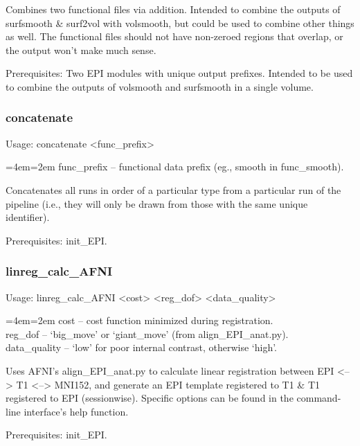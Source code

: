 \documentclass[final,titlepage,letterpaper,oneside,12pt]{article}
\renewcommand{\texttt}[2][BrickRed]{\textcolor{#1}{\ttfamily #2}}%
\newenvironment{blockquote}{%
  \par%
  \medskip
  \leftskip=4em\rightskip=2em%
  \noindent\ignorespaces}{%
  \par\medskip}
\begin{document}
\noindent Combines two functional files via addition. Intended to combine the outputs of \texttt{surfsmooth} \& \texttt{surf2vol} with \texttt{volsmooth}, but could be used to combine other things as well. The functional files should not have non-zeroed regions that overlap, or the output won't make much sense.

Prerequisites: Two EPI modules with unique output prefixes. Intended to be used to combine the outputs of \texttt{volsmooth} and \texttt{surfsmooth} in a single volume. 

\subsubsection{concatenate}
Usage: \texttt{concatenate <func\_prefix>}

\begin{blockquote}
func\_prefix -- functional data prefix (eg., smooth in func\_smooth).
\end{blockquote}

\noindent Concatenates all runs in order of a particular type from a particular run of the pipeline (i.e., they will only be drawn from those with the same unique identifier).

Prerequisites: \texttt{init\_EPI}.

\subsubsection{linreg\_calc\_AFNI}
Usage: \texttt{linreg\_calc\_AFNI <cost> <reg\_dof> <data\_quality>}

\begin{blockquote}
cost -- cost function minimized during registration. \\
reg\_dof -- `big\_move' or `giant\_move' (from align\_EPI\_anat.py). \\
data\_quality -- `low' for poor internal contrast, otherwise `high'. \
\end{blockquote}

\noindent Uses AFNI's align\_EPI\_anat.py to calculate linear registration between EPI <--> T1 <--> MNI152, and generate an EPI template registered to T1 \& T1 registered to EPI (sessionwise). Specific options can be found in the command-line interface's help function.

Prerequisites: \texttt{init\_EPI}.
\end{document}
